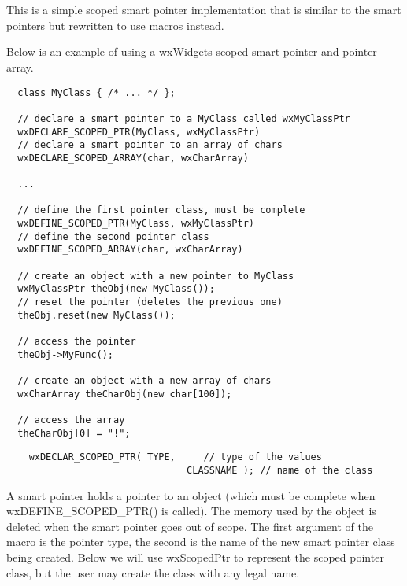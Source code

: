 \section{}\label{wxscopedptr}

This is a simple scoped smart pointer implementation that is similar to 
the  smart pointers but rewritten to
use macros instead.


Below is an example of using a wxWidgets scoped smart pointer and 
pointer array.

\begin{verbatim}
  class MyClass { /* ... */ };

  // declare a smart pointer to a MyClass called wxMyClassPtr
  wxDECLARE_SCOPED_PTR(MyClass, wxMyClassPtr)
  // declare a smart pointer to an array of chars
  wxDECLARE_SCOPED_ARRAY(char, wxCharArray)

  ...

  // define the first pointer class, must be complete
  wxDEFINE_SCOPED_PTR(MyClass, wxMyClassPtr)
  // define the second pointer class
  wxDEFINE_SCOPED_ARRAY(char, wxCharArray)

  // create an object with a new pointer to MyClass
  wxMyClassPtr theObj(new MyClass());
  // reset the pointer (deletes the previous one)
  theObj.reset(new MyClass());

  // access the pointer
  theObj->MyFunc();

  // create an object with a new array of chars
  wxCharArray theCharObj(new char[100]);

  // access the array
  theCharObj[0] = "!";
\end{verbatim}


\begin{verbatim}
    wxDECLAR_SCOPED_PTR( TYPE,     // type of the values
                                CLASSNAME ); // name of the class
\end{verbatim}

A smart pointer holds a pointer to an object (which must be complete
when wxDEFINE\_SCOPED\_PTR() is called). The memory used by the object is
deleted when the smart pointer goes out of scope. The first argument
of the macro is the pointer type, the second is the name of the new
smart pointer class being created.  Below we will use wxScopedPtr to
represent the scoped pointer class, but the user may create the class with any
legal name.

